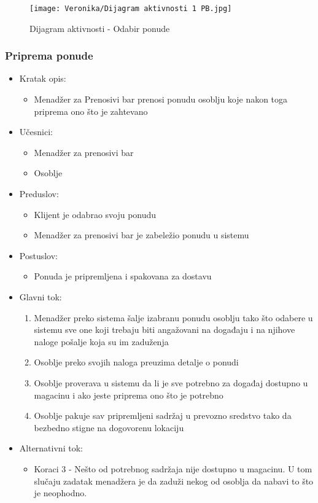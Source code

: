 \documentclass[a4paper]{article}
\begin{document}
\begin{figure}[H]
    \centering
    \texttt{[image: Veronika/Dijagram aktivnosti 1 PB.jpg]}
    \caption{Dijagram aktivnosti - Odabir ponude}
    \label{fig:PrenosiviBar}
\end{figure}


\subsubsection{Priprema ponude}

\begin{itemize}
    \item Kratak opis:
        \begin{itemize}
            \item Menadžer za Prenosivi bar prenosi ponudu osoblju koje nakon toga priprema ono što je zahtevano
        \end{itemize}
    \item Učesnici:
        \begin{itemize}
            \item Menadžer za prenosivi bar
            \item Osoblje
        \end{itemize}
    \item Preduslov:
        \begin{itemize}
            \item Klijent je odabrao svoju ponudu
		    \item Menadžer za prenosivi bar je zabeležio ponudu u sistemu
        \end{itemize}
    \item Postuslov:
        \begin{itemize}
            \item Ponuda je pripremljena i spakovana za dostavu
        \end{itemize}
    \item Glavni tok:
        \begin{enumerate}
           \item Menadžer preko sistema šalje izabranu ponudu osoblju tako što odabere u sistemu sve one koji trebaju biti angažovani na događaju i na njihove naloge pošalje koja su im zaduženja
		   \item Osoblje preko svojih naloga preuzima detalje o ponudi
	       \item Osoblje proverava u sistemu da li je sve potrebno za događaj dostupno u magacinu i ako jeste priprema ono što je potrebno
	        \item Osoblje pakuje sav pripremljeni sadržaj u prevozno sredstvo tako da bezbedno stigne na dogovorenu lokaciju 
        \end{enumerate}
    \item Alternativni tok:
        \begin{itemize}
            \item Koraci 3 - Nešto od potrebnog sadržaja nije dostupno u magacinu. U tom slučaju zadatak menadžera je da zaduži nekog od osoblja da nabavi to što je neophodno.
        \end{itemize}
\end{itemize}
\end{document}
